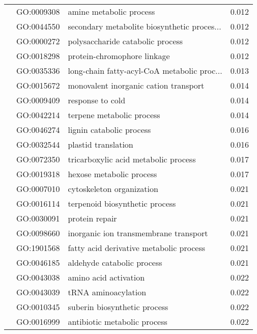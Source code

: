 \begin{longtable}{lllr}
   & GO:0009308 &                      amine metabolic process &         0.012 \\
   & GO:0044550 &  secondary metabolite biosynthetic proces... &         0.012 \\
   & GO:0000272 &             polysaccharide catabolic process &         0.012 \\
   & GO:0018298 &                  protein-chromophore linkage &         0.012 \\
   & GO:0035336 &  long-chain fatty-acyl-CoA metabolic proc... &         0.013 \\
   & GO:0015672 &        monovalent inorganic cation transport &         0.014 \\
   & GO:0009409 &                             response to cold &         0.014 \\
   & GO:0042214 &                    terpene metabolic process &         0.014 \\
   & GO:0046274 &                     lignin catabolic process &         0.016 \\
   & GO:0032544 &                          plastid translation &         0.016 \\
   & GO:0072350 &         tricarboxylic acid metabolic process &         0.017 \\
   & GO:0019318 &                     hexose metabolic process &         0.017 \\
   & GO:0007010 &                    cytoskeleton organization &         0.021 \\
   & GO:0016114 &               terpenoid biosynthetic process &         0.021 \\
   & GO:0030091 &                               protein repair &         0.021 \\
   & GO:0098660 &        inorganic ion transmembrane transport &         0.021 \\
   & GO:1901568 &      fatty acid derivative metabolic process &         0.021 \\
   & GO:0046185 &                   aldehyde catabolic process &         0.021 \\
   & GO:0043038 &                        amino acid activation &         0.022 \\
   & GO:0043039 &                          tRNA aminoacylation &         0.022 \\
   & GO:0010345 &                 suberin biosynthetic process &         0.022 \\
   & GO:0016999 &                 antibiotic metabolic process &         0.022 \\

\end{longtable}
